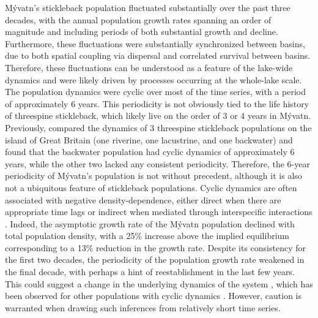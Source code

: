 \documentclass[11pt]{article}
\begin{document}
{M\'{y}vatn's stickleback population fluctuated substantially over the past three decades,
with the annual population growth rates spanning an order of magnitude and including
periods of both substantial growth and decline.
Furthermore, these fluctuations were substantially synchronized between basins,
due to both spatial coupling via dispersal
and correlated survival between basins. 
Therefore, these fluctuations can be understood as a feature of the lake-wide dynamics
and were likely driven by processes occurring at the whole-lake scale.
The population dynamics were cyclic over most of the time series,
with a period of approximately 6 years. 
This periodicity is not obviously tied to the life history of threespine stickleback,
which likely live on the order of 3 or 4 years in M\'{y}vatn.
Previously,
\cite{wootton2005} compared the dynamics of 3 threespine stickleback populations 
on the island of Great Britain (one riverine, one lacustrine, and one backwater)
and found that the backwater population had cyclic dynamics of approximately
6 years, while the other two lacked any consistent periodicity.
Therefore, the 6-year periodicity of M\'{y}vatn's population is not without precedent,
although it is also not a ubiquitous feature of stickleback populations.
Cyclic dynamics are often associated with negative density-dependence, 
either direct when there are appropriate time lags \citep{may1974}
or indirect when mediated through interspecific interactions 
\citep{nicholson1935, rosenzweig1963}.
Indeed, the asymptotic growth rate of the M\'{y}vatn population declined 
with total population density,
with a 25\% increase above the implied equilibrium corresponding to a 13\% 
reduction in the  growth rate.
Despite its consistency for the first two decades, 
the periodicity of the population growth rate weakened in the final decade, 
with perhaps a hint of reestablishment in the last few years.
This could suggest a change in the underlying dynamics of the system
\citep{carpenter2011},
which has been observed for other populations with cyclic dynamics
\citep{ims2008collapsing}.
However, caution is warranted when drawing such inferences 
from relatively short time series.

}
\end{document}
